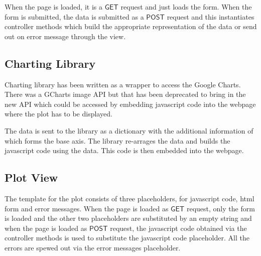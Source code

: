 \documentclass[a4paper,12pt, titlepage]{article}
\begin{document}
When the page is loaded, it is a $\mathsf{GET}$ request and just loads the form. When the form is submitted, the data is submitted as a $\mathsf{POST}$ request and this instantiates controller methods which build the appropriate representation of the data or send out on error message through the view.

\subsection{Charting Library}
Charting library has been written as a wrapper to access the Google Charts. There was a GCharts image API but that has been deprecated to bring in the new API which could be accessed by embedding javascript code into the webpage where the plot has to be displayed. 

The data is sent to the library as a dictionary with the additional information of which forms the base axis. The library re-arrages the data and builds the javascript code using the data. This code is then embedded into the webpage.

\subsection{Plot View}
The template for the plot consists of three placeholders, for javascript code, html form and error messages. When the page is loaded as $\mathsf{GET}$ request, only the form is loaded and the other two placeholders are substituted by an empty string and when the page is loaded as $\mathsf{POST}$ request, the javascript code obtained via the controller methods is used to substitute the javascript code placeholder. All the errors are spewed out via the error messages placeholder.
\end{document}
